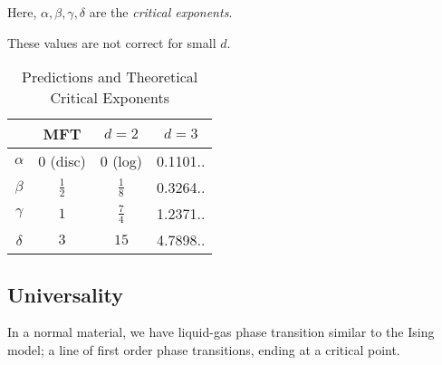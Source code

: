 \documentclass[12pt]{article}
\begin{document}
Here, $\alpha, \beta, \gamma, \delta$ are the \emph{critical exponents}.

These values are not correct for small $d$.

\begin{table}[ht]
\centering
\begin{tabular}{c|ccc}
	& MFT & $d = 2$ & $d = 3$ \\
\hline
	$\alpha$ & $0$ (disc) & $0$ (log) & 0.1101.. \\
	$\beta$ & $\frac{1}{2}$ & $\frac{1}{8}$ & 0.3264.. \\
	$\gamma$ & $1$ & $\frac{7}{4}$ & 1.2371..\\
	$\delta$ & $3$ & $15$ & 4.7898..
\end{tabular}
\caption{Predictions and Theoretical Critical Exponents}
\end{table}

\subsection{Universality}%
\label{sub:univ}

\begin{center}
\end{center}

In a normal material, we have liquid-gas phase transition similar to the Ising model; a line of first order phase transitions, ending at a critical point.
\end{document}

